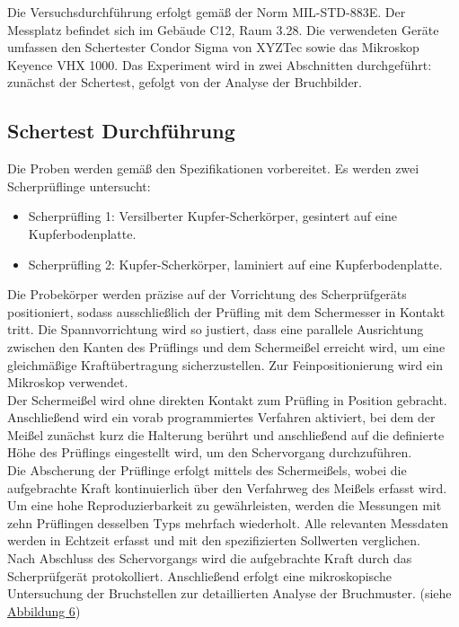 Die Versuchsdurchführung erfolgt gemäß der Norm MIL-STD-883E. Der Messplatz befindet sich im Gebäude C12, Raum 3.28. Die verwendeten Geräte umfassen den Schertester Condor Sigma von XYZTec sowie das Mikroskop Keyence VHX 1000. Das Experiment wird in zwei Abschnitten durchgeführt: zunächst der Schertest, gefolgt von der Analyse der Bruchbilder.

\subsection{Schertest Durchführung}
Die Proben werden gemäß den Spezifikationen vorbereitet. Es werden zwei Scherprüflinge untersucht:
\begin{itemize}
    \item Scherprüfling 1: Versilberter Kupfer-Scherkörper, gesintert auf eine Kupferbodenplatte.
    \item     Scherprüfling 2: Kupfer-Scherkörper, laminiert auf eine Kupferbodenplatte.
\end{itemize}
Die Probekörper werden präzise auf der Vorrichtung des Scherprüfgeräts positioniert, sodass ausschließlich der Prüfling mit dem Schermesser in Kontakt tritt. Die Spannvorrichtung wird so justiert, dass eine parallele Ausrichtung zwischen den Kanten des Prüflings und dem Schermeißel erreicht wird, um eine gleichmäßige Kraftübertragung sicherzustellen. Zur Feinpositionierung wird ein Mikroskop verwendet.\\

Der Schermeißel wird ohne direkten Kontakt zum Prüfling in Position gebracht. Anschließend wird ein vorab programmiertes Verfahren aktiviert, bei dem der Meißel zunächst kurz die Halterung berührt und anschließend auf die definierte Höhe des Prüflings eingestellt wird, um den Schervorgang durchzuführen.\\

Die Abscherung der Prüflinge erfolgt mittels des Schermeißels, wobei die aufgebrachte Kraft kontinuierlich über den Verfahrweg des Meißels erfasst wird. Um eine hohe Reproduzierbarkeit zu gewährleisten, werden die Messungen mit zehn Prüflingen desselben Typs mehrfach wiederholt. Alle relevanten Messdaten werden in Echtzeit erfasst und mit den spezifizierten Sollwerten verglichen.\\

Nach Abschluss des Schervorgangs wird die aufgebrachte Kraft durch das Scherprüfgerät protokolliert. Anschließend erfolgt eine mikroskopische Untersuchung der Bruchstellen zur detaillierten Analyse der Bruchmuster. (siehe \hyperref[CondorSigma]{Abbildung 6})

